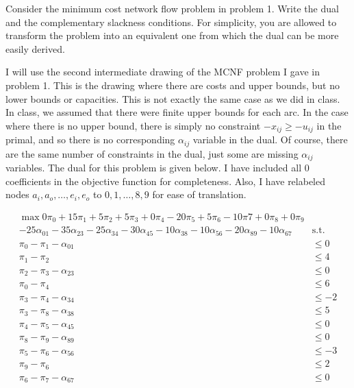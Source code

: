 \documentclass[fleqn]{homework}
\begin{document}
  \begin{problem}{3}
    \begin{question}
      Consider the minimum cost network flow problem in problem 1.  Write the
      dual and the complementary slackness conditions.  For simplicity, you are
      allowed to transform the problem into an equivalent one from which the
      dual can be more easily derived.
    \end{question}

    I will use the second intermediate drawing of the MCNF problem I gave in
    problem 1.  This is the drawing where there are costs and upper bounds, but
    no lower bounds or capacities.  This is not exactly the same case as we did
    in class.  In class, we assumed that there were finite upper bounds for each
    arc.  In the case where there is no upper bound, there is simply no
    constraint $-x_{ij} \ge -u_{ij}$ in the primal, and so there is no
    corresponding $\alpha_{ij}$ variable in the dual.  Of course, there are the
    same number of constraints in the dual, just some are missing $\alpha_{ij}$
    variables.  The dual for this problem is given below.  I have included all 0
    coefficients in the objective function for completeness.  Also, I have
    relabeled nodes $a_i, a_o, \dots, e_i, e_o$ to $0, 1, \dots, 8, 9$ for ease
    of translation.

    \begin{alignat*}{1}
      \max 0\pi_0 + 15\pi_1 + 5\pi_2 + 5\pi_3 + 0\pi_4 - 20\pi_5 + 5\pi_6 -
      10\pi7 + 0\pi_8 + 0\pi_9 & \\
      -25\alpha_{01} - 35\alpha_{23} - 25\alpha_{34} - 30\alpha_{45} -
      10\alpha_{38} - 10\alpha_{56} - 20\alpha_{89} - 10\alpha_{67} &\text{
        s.t.} \\
      \pi_0 - \pi_1 - \alpha_{01} &\le 0 \\
      \pi_1 - \pi_2 &\le 4 \\
      \pi_2 - \pi_3 - \alpha_{23} &\le 0 \\
      \pi_0 - \pi_4 &\le 6 \\
      \pi_3 - \pi_4 - \alpha_{34} &\le -2 \\
      \pi_3 - \pi_8 - \alpha_{38} &\le 5 \\
      \pi_4 - \pi_5 - \alpha_{45} &\le 0 \\
      \pi_8 - \pi_9 - \alpha_{89} &\le 0 \\
      \pi_5 - \pi_6 - \alpha_{56} &\le -3 \\
      \pi_9 - \pi_6 &\le 2 \\
      \pi_6 - \pi_7 - \alpha_{67} &\le 0 \\
    \end{alignat*}


\end{problem}
\end{document}
